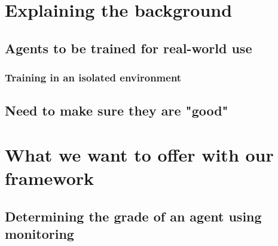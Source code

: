 \section{Explaining the background}
\subsection{Agents to be trained for real-world use}
\subsubsection{Training in an isolated environment}
\subsection{Need to make sure they are "good"}
\section{What we want to offer with our framework}
\subsection{Determining the grade of an agent using monitoring}
